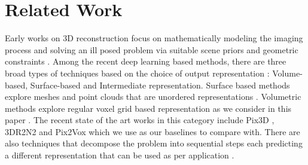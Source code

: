 \section{Related Work}


Early works on 3D reconstruction focus on mathematically modeling the imaging process and solving an ill posed problem via suitable scene priors and geometric constraints \cite{hartley2003multiple}.
Among the recent deep learning based methods, there are three broad types of techniques based on the choice of output representation :
Volume-based, Surface-based and Intermediate representation.
Surface based methods explore meshes and point clouds that are unordered representations \cite{wang2018pixel2mesh, kanazawa2018learning, pontes2018image2mesh}. 
Volumetric methods explore regular voxel grid based representation as we consider in this paper \cite{wu2017marrnet, tulsiani2017multi, yang2018learning}.
The recent state of the art works in this category include Pix3D \cite{sun2018pix3d}, 3DR2N2 \cite{3dr2n2} and Pix2Vox \cite{pix2vox} which we use as our baselines to compare with.
There are also techniques that decompose the problem into sequential steps each predicting a different representation that can be used as per application \cite{tatarchenko2016multi, lin2018learning}.


